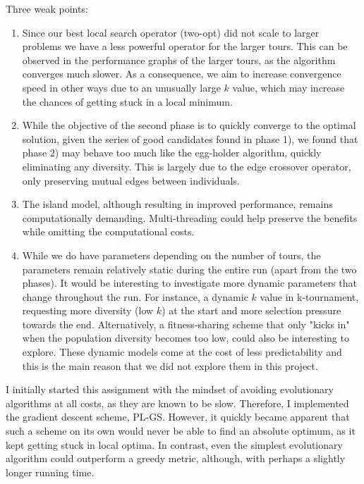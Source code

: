 \documentclass[a4paper,10pt]{article}
\begin{document}
Three weak points:
\begin{enumerate}
\item Since our best local search operator (two-opt) did not scale to larger problems we have a less powerful operator for the larger tours. This can be observed in the performance graphs of the larger tours, as the algorithm converges much slower. As a consequence, we aim to increase convergence speed in other ways due to an unusually large $k$ value, which may increase the chances of getting stuck in a local minimum.
\item While the objective of the second phase is to quickly converge to the optimal solution, given the series of good candidates found in phase 1), we found that phase 2) may behave too much like the egg-holder algorithm, quickly eliminating any diversity. This is largely due to the edge crossover operator, only preserving mutual edges between individuals.

\item The island model, although resulting in improved performance, remains computationally demanding. Multi-threading could help preserve the benefits while omitting the computational costs.

\item While we do have parameters depending on the number of tours, the parameters remain relatively static during the entire run (apart from the two phases). It would be interesting to investigate more dynamic parameters that change throughout the run. For instance, a dynamic $k$ value in k-tournament, requesting more diversity (low $k$) at the start and more selection pressure towards the end. Alternatively, a fitness-sharing scheme that only "kicks in" when the population diversity becomes too low, could also be interesting to explore. These dynamic models come at the cost of less predictability and this is the main reason that we did not explore them in this project.
\end{enumerate}


I initially started this assignment with the mindset of avoiding evolutionary algorithms at all costs, as they are known to be slow. Therefore, I implemented the gradient descent scheme, PL-GS. However, it quickly became apparent that such a scheme on its own would never be able to find an absolute optimum, as it kept getting stuck in local optima. In contrast, even the simplest evolutionary algorithm could outperform a greedy metric, although, with perhaps a slightly longer running time.
\end{document}
